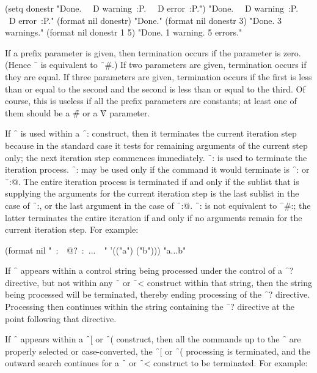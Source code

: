 \code
 (setq donestr "Done.~{\hat} ~D warning~:P.~{\hat} ~D error~:P.")
\EV "Done.~{\hat} ~D warning~:P.~{\hat} ~D error~:P."
 (format nil donestr) \EV "Done."
 (format nil donestr 3) \EV "Done. 3 warnings."
 (format nil donestr 1 5) \EV "Done. 1 warning. 5 errors."
\endcode
                                
If a prefix parameter is given, then termination occurs if the parameter
is zero.  (Hence \f{~{\hat}} is equivalent to 
\f{~\#{\hat}}.)  If two
parameters are given, termination occurs if they are equal.
  If three
parameters are given, termination occurs if the first is less than or
equal to the second and the second is less than or equal to the third.
Of course, this is useless if all the prefix parameters are constants; at
least one of them should be a \f{\#} or a \f{V} parameter.

If \f{~{\hat}} is used within a \f{~:\lbr  } 
construct, then it terminates
the current iteration step because in the standard case it tests for
remaining arguments of the current step only; the next iteration step
commences immediately.  \f{~:{\hat}} is used to terminate
the iteration process.
\f{~:{\hat}} 
may be used only if the command it would terminate is 
\f{~:\lbr  } or \f{~:@\lbr  }.
The entire iteration process is terminated if and only if the sublist that is
supplying the arguments for the current iteration step is the last sublist in
the case of \f{~:\lbr }, 
or the last         
argument in the case of \f{~:@\lbr  }. 
\f{~:{\hat}} is not
equivalent to \f{~\#:{\hat}}; 
the latter terminates the entire iteration if and only if no
arguments remain for the current iteration step.
For example:

\code
 (format nil "~:\lbr\ ~@?~:\hat\ ...~\rbr\ " '(("a") ("b"))) \EV "a...b"
\endcode
{}

If \f{~{\hat}} appears within a control string being processed
under the control of a \f{~?} directive, but not within
any \f{~\lbr  } or \f{~<} construct within that string,
then the string being
processed will be terminated, thereby ending processing
of the \f{~?} directive.  Processing then
continues within the string   
containing the \f{~?} directive at the point following that directive.

If \f{~{\hat}}                                          
appears within a \f{~[} or \f{~(} construct,
then all the commands up to the \f{~{\hat}} are properly selected
or case-converted,                   
the \f{~[} or \f{~(} processing is terminated,
and the outward search continues         
for a \f{~\lbr  } or \f{~<} construct
to be terminated.  For example:
                            
